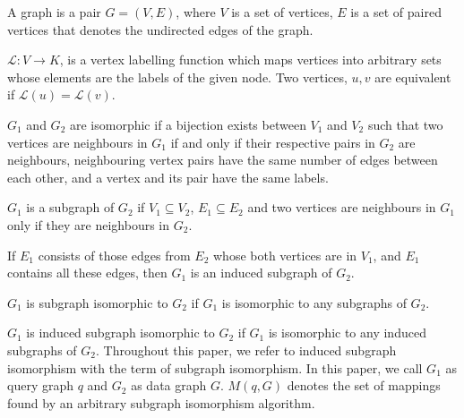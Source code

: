 \begin{definition}[Graph]
    A graph is a pair \(G = (V,E)\), where \(V\) is a set of vertices,
    \(E\) is a set of paired vertices that denotes the undirected edges 
    of the graph. 
\end{definition}

\begin{definition}[Labelling]
    \( \mathcal{L} : V \rightarrow K \), is a vertex labelling function 
    which maps vertices into arbitrary sets whose elements are the labels
    of the given node. Two vertices, \(u, v\) are equivalent if 
    \( \mathcal{L}(u) = \mathcal{L}(v) \).
\end{definition}

\begin{definition}[Isomorphism]
    \(G_1\) and \(G_2\) are isomorphic if a bijection exists between \(V_1\)
    and \(V_2\) such that two vertices are neighbours in \(G_1\) if and only
    if their respective pairs in \(G_2\) are neighbours, neighbouring 
    vertex pairs have the same number of edges between each other, and a
    vertex and its pair have the same labels.
\end{definition}

\begin{definition}[Subgraph]
    \(G_1\) is a subgraph of \(G_2\) if \(V_1 \subseteq V_2 \), \(E_1 \subseteq E_2\)
    and two vertices are neighbours in \(G_1\) only if they are neighbours in \(G_2\).
\end{definition}

\begin{definition}
    If \(E_1\) consists of those edges from \(E_2\) whose both vertices are in
    \(V_1\), and \(E_1\) contains all these edges, then \(G_1\) is an induced
    subgraph of \(G_2\).
\end{definition}

\begin{definition}
    \(G_1\) is subgraph isomorphic to \(G_2\) if \(G_1\) is isomorphic to any
    subgraphs of \(G_2\).
\end{definition}

\begin{definition}
    \(G_1\) is induced subgraph isomorphic to \(G_2\) if \(G_1\) is isomorphic to any
    induced subgraphs of \(G_2\). Throughout this paper, we refer to induced subgraph
    isomorphism with the term of subgraph isomorphism. In this paper, we call $G_1$ as
    query graph $q$ and $G_2$ as data graph $G$. $M(q, G)$ denotes the set of mappings 
    found by an arbitrary subgraph isomorphism algorithm.
\end{definition}

